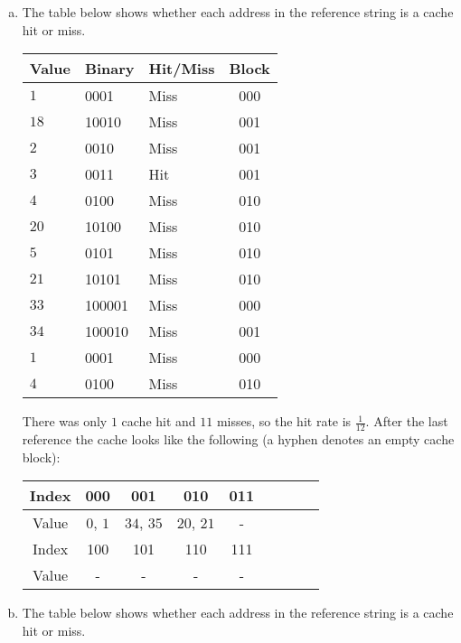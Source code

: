 \documentclass[10pt]{article} %
\begin{document}
\begin{enumerate}
\begin{enumerate}[a)]
\item %

The table below shows whether each address in the reference string is a cache hit or miss.  

\begin{center}
\begin{tabular}{| l | l | l | c |}
\hline 
Value & Binary & Hit/Miss & Block \\
\hline 
$1$ & 0001 & Miss & 000 \\
$18$ & 10010 & Miss & 001 \\
$2$ & 0010 & Miss & 001 \\
$3$ & 0011 & Hit & 001 \\
$4$ & 0100 & Miss & 010 \\
$20$ & 10100 & Miss & 010 \\
$5$ & 0101 & Miss & 010 \\
$21$ & 10101 & Miss & 010 \\
$33$ & 100001 & Miss & 000 \\
$34$ & 100010 & Miss & 001 \\
$1$ & 0001 & Miss & 000 \\
$4$ & 0100 & Miss & 010 \\
\hline 
\end{tabular}
\end{center}

There was only $1$ cache hit and $11$ misses, so the hit rate is $\frac{1}{12}$.  
After the last reference the cache looks like the following (a hyphen denotes an empty cache block):

\begin{center}
\begin{tabular}{| c | c | c | c | c | c | c | c | c |}
\hline
Index & 000 & 001 & 010 & 011 \\
\hline
Value & $0$, $1$ & $34$, $35$ & $20$, $21$ & - \\
\hline
Index & 100 & 101 & 110 & 111 \\
\hline
Value & - & - & - & - \\
\hline
\end{tabular}
\end{center}

\item %

The table below shows whether each address in the reference string is a cache hit or miss.  


\end{enumerate}
\end{enumerate}
\end{document}
